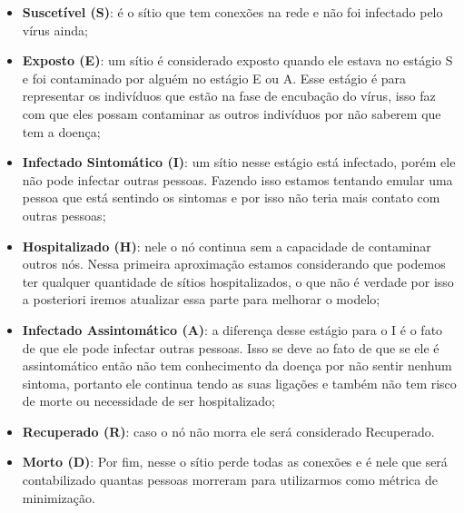 \begin{itemize}
  \item \textbf{Suscetível (S)}: é o sítio que tem conexões na rede e não foi infectado pelo vírus ainda;
  \item \textbf{Exposto (E)}: um sítio é considerado exposto quando ele estava no estágio S e foi contaminado por alguém no estágio E ou A. Esse estágio é para representar os indivíduos que estão na fase de encubação do vírus, isso faz com que eles possam contaminar as outros indivíduos por não saberem que tem a doença;
  \item \textbf{Infectado Sintomático (I)}: um sítio nesse estágio está infectado, porém ele não pode infectar outras pessoas. Fazendo isso estamos tentando emular uma pessoa que está sentindo os sintomas e por isso não teria mais contato com outras pessoas;
  \item \textbf{Hospitalizado (H)}: nele o nó continua sem a capacidade de contaminar outros nós. Nessa primeira aproximação estamos considerando que podemos ter qualquer quantidade de sítios hospitalizados, o que não é verdade por isso a posteriori iremos atualizar essa parte para melhorar o modelo;
  \item \textbf{Infectado Assintomático (A)}: a diferença desse estágio para o I é o fato de que ele pode infectar outras pessoas. Isso se deve ao fato de que se ele é assintomático então não tem conhecimento da doença por não sentir nenhum sintoma, portanto ele continua tendo as suas ligações e também não tem risco de morte ou necessidade de ser hospitalizado;
  \item \textbf{Recuperado (R)}: caso o nó não morra ele será considerado Recuperado.
  \item \textbf{Morto (D)}: Por fim, nesse o sítio perde todas as conexões e é nele que será contabilizado quantas pessoas morreram para utilizarmos como métrica de minimização.
\end{itemize}

